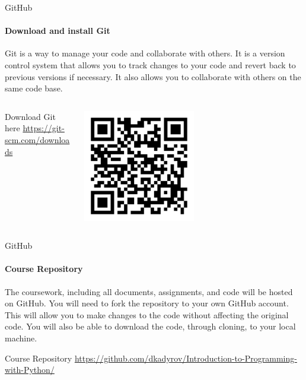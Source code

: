 \documentclass[
    aspectratio=169, 
    usepdftitle=false, 
    xcolor={dvipsnames},
    hyperref={
        colorlinks,
        linkcolor=black,
        urlcolor=blue}
    ]{beamer}
\begin{document}
\begin{frame}{GitHub}
    \framesubtitle{Download and install Git}

    Git is a way to manage your code and collaborate with others. It is a version control system that allows you to track changes to your code and revert back to previous versions if necessary. It also allows you to collaborate with others on the same code base.

    \begin{columns}
        \begin{column}{0.5\textwidth}
            \begin{block}{Download Git here}
                \url{https://git-scm.com/downloads}
            \end{block}
        \end{column}
        \begin{column}{0.5\textwidth}  %
            \begin{center}
             \includegraphics[width=0.5\textwidth]{qr-code.pdf}
             \end{center}
        \end{column}
    \end{columns}
\end{frame}

\begin{frame}{GitHub}
    \framesubtitle{Course Repository}

    The coursework, including all documents, assignments, and code will be hosted on GitHub. You will need to fork the repository to your own GitHub account. This will allow you to make changes to the code without affecting the original code. You will also be able to download the code, through cloning, to your local machine.

    \begin{block}{Course Repository}
        \url{https://github.com/dkadyrov/Introduction-to-Programming-with-Python/}
    \end{block}
    
\end{frame}
\end{document}
